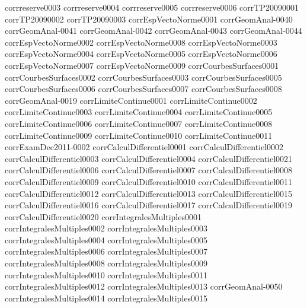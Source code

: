 {corrreserve0003}
{corrreserve0004}
{corrreserve0005}
{corrreserve0006}
{corrTP20090001}
{corrTP20090002}
{corrTP20090003}
{corrEspVectoNorme0001}
{corrGeomAnal-0040}
{corrGeomAnal-0041}
{corrGeomAnal-0042}
{corrGeomAnal-0043}
{corrGeomAnal-0044}
{corrEspVectoNorme0002}
{corrEspVectoNorme0008}
{corrEspVectoNorme0003}
{corrEspVectoNorme0004}
{corrEspVectoNorme0005}
{corrEspVectoNorme0006}
{corrEspVectoNorme0007}
{corrEspVectoNorme0009}
{corrCourbesSurfaces0001}
{corrCourbesSurfaces0002}
{corrCourbesSurfaces0003}
{corrCourbesSurfaces0005}
{corrCourbesSurfaces0006}
{corrCourbesSurfaces0007}
{corrCourbesSurfaces0008}
{corrGeomAnal-0019}
{corrLimiteContinue0001}
{corrLimiteContinue0002}
{corrLimiteContinue0003}
{corrLimiteContinue0004}
{corrLimiteContinue0005}
{corrLimiteContinue0006}
{corrLimiteContinue0007}
{corrLimiteContinue0008}
{corrLimiteContinue0009}
{corrLimiteContinue0010}
{corrLimiteContinue0011}
{corrExamDec2011-0002}
{corrCalculDifferentiel0001}
{corrCalculDifferentiel0002}
{corrCalculDifferentiel0003}
{corrCalculDifferentiel0004}
{corrCalculDifferentiel0021}
{corrCalculDifferentiel0006}
{corrCalculDifferentiel0007}
{corrCalculDifferentiel0008}
{corrCalculDifferentiel0009}
{corrCalculDifferentiel0010}
{corrCalculDifferentiel0011}
{corrCalculDifferentiel0012}
{corrCalculDifferentiel0013}
{corrCalculDifferentiel0015}
{corrCalculDifferentiel0016}
{corrCalculDifferentiel0017}
{corrCalculDifferentiel0019}
{corrCalculDifferentiel0020}
{corrIntegralesMultiples0001}
{corrIntegralesMultiples0002}
{corrIntegralesMultiples0003}
{corrIntegralesMultiples0004}
{corrIntegralesMultiples0005}
{corrIntegralesMultiples0006}
{corrIntegralesMultiples0007}
{corrIntegralesMultiples0008}
{corrIntegralesMultiples0009}
{corrIntegralesMultiples0010}
{corrIntegralesMultiples0011}
{corrIntegralesMultiples0012}
{corrIntegralesMultiples0013}
{corrGeomAnal-0050}
{corrIntegralesMultiples0014}
{corrIntegralesMultiples0015}
